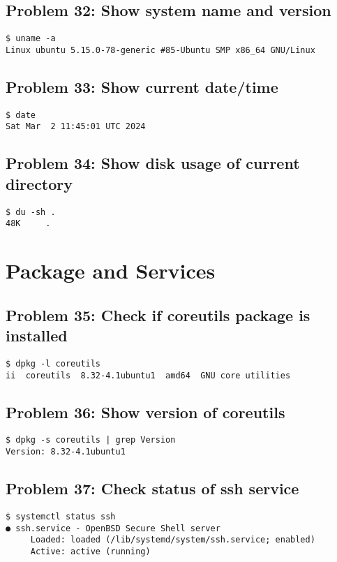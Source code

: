 \subsection*{Problem 32: Show system name and version}
\begin{verbatim}
$ uname -a
Linux ubuntu 5.15.0-78-generic #85-Ubuntu SMP x86_64 GNU/Linux
\end{verbatim}

\subsection*{Problem 33: Show current date/time}
\begin{verbatim}
$ date
Sat Mar  2 11:45:01 UTC 2024
\end{verbatim}

\subsection*{Problem 34: Show disk usage of current directory}
\begin{verbatim}
$ du -sh .
48K     .
\end{verbatim}

\section{Package and Services}

\subsection*{Problem 35: Check if coreutils package is installed}
\begin{verbatim}
$ dpkg -l coreutils
ii  coreutils  8.32-4.1ubuntu1  amd64  GNU core utilities
\end{verbatim}

\subsection*{Problem 36: Show version of coreutils}
\begin{verbatim}
$ dpkg -s coreutils | grep Version
Version: 8.32-4.1ubuntu1
\end{verbatim}

\subsection*{Problem 37: Check status of ssh service}
\begin{verbatim}
$ systemctl status ssh
● ssh.service - OpenBSD Secure Shell server
     Loaded: loaded (/lib/systemd/system/ssh.service; enabled)
     Active: active (running)
\end{verbatim}

